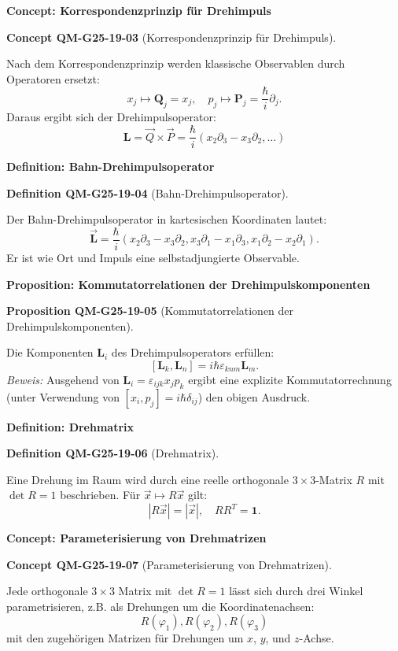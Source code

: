 \documentclass[10pt, letterpaper]{article}
\newcommand{\CustomHeading}[3]{%
  \par\medskip\noindent%
  \textbf{#1 #2} \textnormal{(#3)}.\enskip%
}
\newenvironment{DEF}[2]{\begin{unitbox}\CustomHeading{Definition}{#1}{#2}}{\end{unitbox}}
\newenvironment{PROP}[2]{\begin{unitbox}\CustomHeading{Proposition}{#1}{#2}}{\end{unitbox}}
\newenvironment{CONC}[2]{\begin{unitbox}\CustomHeading{Concept}{#1}{#2}}{\end{unitbox}}
\begin{document}
\textbf{Concept: Korrespondenzprinzip für Drehimpuls}  

\begin{CONC}{QM-G25-19-03}{Korrespondenzprinzip für Drehimpuls}
Nach dem Korrespondenzprinzip werden klassische Observablen durch Operatoren ersetzt:
$$
x_j \mapsto \mathbf{Q}_j = x_j, \quad p_j \mapsto \mathbf{P}_j = \frac{\hbar}{i} \partial_j.
$$
Daraus ergibt sich der Drehimpulsoperator:  
$$
\mathbf{L} = \vec{Q} \times \vec{P} = \frac{\hbar}{i} (x_2 \partial_3 - x_3 \partial_2, \dots)
$$
\end{CONC}


\textbf{Definition: Bahn-Drehimpulsoperator}  

\begin{DEF}{QM-G25-19-04}{Bahn-Drehimpulsoperator}
Der Bahn-Drehimpulsoperator in kartesischen Koordinaten lautet:  
$$
\overrightarrow{\mathbf{L}} = \frac{\hbar}{i}(x_2 \partial_3 - x_3 \partial_2, x_3 \partial_1 - x_1 \partial_3, x_1 \partial_2 - x_2 \partial_1).
$$
Er ist wie Ort und Impuls eine selbstadjungierte Observable.
\end{DEF}


\textbf{Proposition: Kommutatorrelationen der Drehimpulskomponenten}  


\begin{PROP}{QM-G25-19-05}{Kommutatorrelationen der Drehimpulskomponenten}
Die Komponenten $\mathbf{L}_i$ des Drehimpulsoperators erfüllen:
$$
[\mathbf{L}_k, \mathbf{L}_n] = i \hbar \varepsilon_{knm} \mathbf{L}_m.
$$  
\textit{Beweis:} Ausgehend von $\mathbf{L}_i = \varepsilon_{ijk} x_j p_k$ ergibt eine explizite Kommutatorrechnung (unter Verwendung von $[x_i, p_j] = i \hbar \delta_{ij}$) den obigen Ausdruck.
\end{PROP}


\textbf{Definition: Drehmatrix}


\begin{DEF}{QM-G25-19-06}{Drehmatrix}
Eine Drehung im Raum wird durch eine reelle orthogonale $3 \times 3$-Matrix $R$ mit $\det R = 1$ beschrieben. Für $\vec{x} \mapsto R \vec{x}$ gilt:  
$$
|R \vec{x}| = |\vec{x}|, \quad R R^T = \mathbf{1}.
$$
\end{DEF}


\textbf{Concept: Parameterisierung von Drehmatrizen}  
\begin{CONC}{QM-G25-19-07}{Parameterisierung von Drehmatrizen}
Jede orthogonale $3\times3$ Matrix mit $\det R = 1$ lässt sich durch drei Winkel parametrisieren, z.B. als Drehungen um die Koordinatenachsen:
$$
R(\varphi_1), R(\varphi_2), R(\varphi_3)
$$
mit den zugehörigen Matrizen für Drehungen um $x$, $y$, und $z$-Achse.
\end{CONC}
\end{document}
